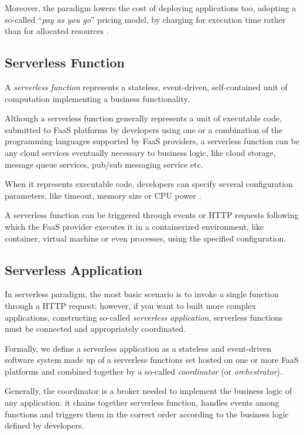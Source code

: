 \documentclass[10pt,a4paper]{report}
\theoremstyle{definition}
\begin{document}
Moreover, the paradigm lowers the cost of deploying applications too, adopting a so-called “\textit{pay as you go}” pricing model, by charging for execution time rather than for allocated resources \cite{COSE}.


\subsection{Serverless Function}

A \textit{serverless function} represents a stateless, event-driven, self-contained unit of computation implementing a business functionality.

Although a serverless function generally represents a unit of executable code, submitted to FaaS platforms by developers using one or a combination of the programming languages supported by FaaS providers, a serverless function can be any cloud services eventually necessary to business logic, like cloud storage, message queue services, pub/sub messaging service etc.

When it represents executable code, developers can specify several configuration parameters, like timeout, memory size or CPU power \cite{COSE}.

A serverless function can be triggered through events or HTTP requests following which the FaaS provider executes it in a containerized environment, like container, virtual machine or even processes, using the specified configuration.

\subsection{Serverless Application}

In serverless paradigm, the most basic scenario is to invoke a single function through a HTTP request; however, if you want to built more complex applications, constructing so-called \textit{serverless application}, serverless functions must be connected and appropriately coordinated.

Formally, we define a serverless application as a stateless and event-driven software system made up of a serverless functions set hosted on one or more FaaS platforms and combined together by a so-called \textit{coordinator} (or \textit{orchestrator}).

Generally, the coordinator is a broker needed to implement the business logic of any application: it chains together serverless function, handles events among functions and triggers them in the correct order according to the business logic defined by developers. 
\end{document}
